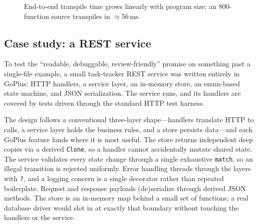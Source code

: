 \documentclass[11pt,a4paper]{article}
\begin{document}
\begin{figure}[ht]
\centering
{}
\caption{End-to-end transpile time grows linearly with program size; an
800-function source transpiles in \(\approx\)56\,ms.}
\label{fig:scaling}
\end{figure}

\subsection{Case study: a REST service}
To test the ``readable, debuggable, review-friendly'' promise on something past a
single-file example, a small task-tracker REST service was written entirely in
GoPlus: HTTP handlers, a service layer, an in-memory store, an enum-based state
machine, and JSON serialization. The service runs, and its handlers are covered
by tests driven through the standard HTTP test harness.

The design follows a conventional three-layer shape---handlers translate HTTP to
calls, a service layer holds the business rules, and a store persists data---and
each GoPlus feature lands where it is most useful. The store returns independent
deep copies via a derived \texttt{Clone}, so a handler cannot accidentally mutate
shared state. The service validates every state change through a single
exhaustive \texttt{match}, so an illegal transition is rejected uniformly. Error
handling threads through the layers with \texttt{?}, and a logging concern is a
single decorator rather than repeated boilerplate. Request and response payloads
(de)serialize through derived JSON methods. The store is an in-memory map behind a
small set of functions; a real database driver would slot in at exactly that
boundary without touching the handlers or the service.
\end{document}

